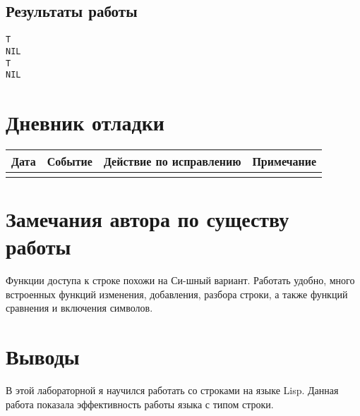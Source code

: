 \documentclass[15pt]{extarticle}
\begin{document}
\subsection{Результаты работы}

\begin{lstlisting}
T
NIL
T
NIL
\end{lstlisting}

\section{Дневник отладки}

\begin{tabular}{|c|c|c|c|}
\hline
Дата     & Событие    & Действие по исправлению   & Примечание \\
\hline
& & & \\
\hline
\end{tabular}

\section{Замечания автора по существу работы}
Функции доступа к строке похожи на Си-шный вариант. Работать удобно, много встроенных функций изменения, добавления, разбора строки, а также функций сравнения и включения символов.

\section{Выводы}
В этой лабораторной я научился работать со строками на языке Lisp. Данная работа показала эффективность работы языка с типом строки.
\end{document}
